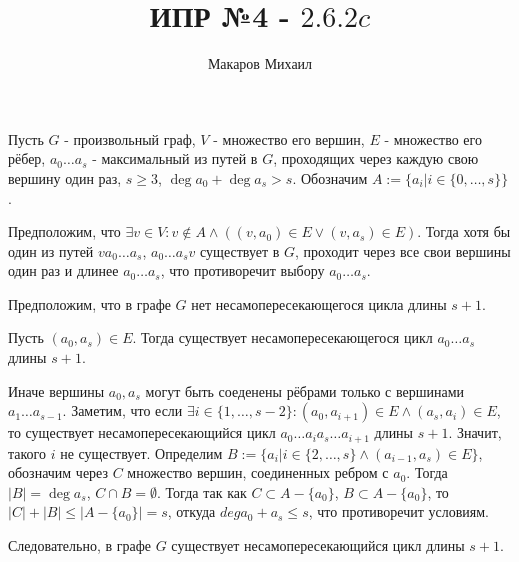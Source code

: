 \documentclass{article}
\title{ИПР №4 - $2.6.2c$}
\author{Макаров Михаил}
\date{}
\newcommand{\range}[2]{
    \{#1, \ldots, #2 \}
}
\begin{document}
	\maketitle
	Пусть $G$ - произвольный граф, $V$ - множество его вершин, $E$ - множество его рёбер, $a_0 \ldots a_s$ -
	максимальный из путей в $G$, проходящих через каждую свою вершину один раз, $s \ge 3$, $ \deg a_0 + \deg a_s > s$.
    Обозначим $A := \{ a_i | i \in \range{0}{s} \}$.
    
    Предположим, что $ \exists v \in V: v \notin A \land ( (v, a_0) \in E \lor (v, a_s) \in E) $. Тогда 
    хотя бы один из путей $va_0 \ldots a_s$, $a_0 \ldots a_sv$ существует в $G$, проходит через все свои вершины
    один раз и длинее $a_0 \ldots a_s$, что противоречит выбору $a_0 \ldots a_s$.

    Предположим, что в графе $G$ нет несамопересекающегося цикла длины $s + 1$.
    
    Пусть $(a_0, a_s) \in E$. Тогда существует несамопересекающегося цикл $a_0 \ldots a_s$ длины $s + 1$.
    
    Иначе вершины $a_0, a_s$ могут быть соеденены рёбрами только с вершинами $a_1 \ldots a_{s - 1} $. 
    Заметим, что если $ \exists i \in \range{1}{s - 2}: (a_0, a_{i + 1}) \in E \land (a_s, a_i) \in E$, то
    существует несамопересекающийся цикл $a_0\ldots a_i a_s \ldots a_{i + 1} $ длины $s + 1$. Значит,
    такого $i$ не существует. Определим $B := \{ a_i| i \in \range{2}{s} \land (a_{i - 1}, a_s) \in E \}$,
    обозначим через $C$ множество вершин, соединенных ребром с $a_0$.
    Тогда $|B| = \deg a_s$, $ C \cap B = \emptyset$. Тогда так как $C \subset A - \{ a_0 \}$,
    $B \subset A - \{ a_0 \}$, то $|C| + |B| \leq |A - \{ a_0 \}| = s$, откуда
    $deg a_0 + a_s \leq s$, что противоречит условиям. 
    
    Следовательно, в графе $G$ существует несамопересекающийся цикл длины $s + 1$.
    
	
\end{document}
